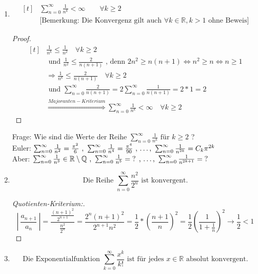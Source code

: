 \documentclass[a4paper,titlepage,oneside]{article}
\def\Q{\ensuremath{\mathbb{Q}} }
\def\R{\ensuremath{\mathbb{R}} }
\def\fa{\ensuremath{\forall}}
\newcommand{\suminf}[2][n]{\ensuremath{\sum_{#1= 0}^{\infty}{#2}}}
\newcommand{\abs}[1]{\ensuremath{\left|\:#1\:\right|}}
\theoremstyle{thmstyle}
\begin{document}
\begin{subbsp}
\begin{enumerate}
\item %
\[\begin{aligned}[t]
&\suminf{\frac{1}{n^k}} < \infty \qquad \forall k \ge 2 \\
&\text{[Bemerkung: Die Konvergenz gilt auch \(\fa k \in \R, k > 1\) ohne Beweis]}
\end{aligned}\]

\begin{proof}
\[\begin{aligned}[t]
&\frac{1}{n^k} \le \frac{1}{n^2} \quad \forall k \ge 2 \\
&\text{ und } \frac{1}{n^2} \le \frac{2}{n(n+1)} \text{ , denn } 2n^2 \ge n(n+1) \Leftrightarrow n^2 \ge n \Leftrightarrow n \ge 1 \\
&\Rightarrow \frac{1}{n^k} \le \frac{2}{n(n+1)} \quad \forall k \ge 2 \\
&\text{ und } \suminf{\frac{2}{n(n+1)}} = 2 \suminf{\frac{1}{n(n+1)}} = 2 * 1 = 2 \\
&\overset{Majoranten-Kriterium}{\Rightarrow} \suminf{\frac{1}{n^k}} < \infty \quad \forall k \ge 2
\end{aligned}\]
\end{proof}
Frage: Wie sind die Werte der Reihe \(\suminf{\frac{1}{n^k}} \text{ für } k \ge 2 \) ? \\
Euler: \(\suminf{\frac{1}{n^2}} = \frac{\pi^2}{6} \text{ , } \suminf{\frac{1}{n^4}} = \frac{\pi^4}{90} \text{ , \dots , } \suminf{\frac{1}{n^{2k}}} = C_k \pi^{2k}\) \\
Aber: \(\suminf{\frac{1}{n^3}} \in \R \setminus \Q \text{ , } \suminf{\frac{1}{n^5}} = \text{? } \text{, \dots , } \suminf{\frac{1}{n^{2k+1}}} = \text{? }\)

\item
\[\text{Die Reihe } \suminf{\frac{n^2}{2^n}} \text{ ist konvergent.}\]

\begin{proof}[Quotienten-Kriterium:]
\[\abs{\frac{a_{n+1}}{a_n}} = \frac{\frac{(n+1)^2}{2^{n+1}}}{\frac{n^2}{2^n}} = \frac{2^n(n+1)^2}{2^{n+1}n^2} = \frac{1}{2} * \left(\frac{n+1}{n}\right)^2 = \frac{1}{2} \left(\frac{1}{1+\frac{1}{n}}\right)^2 \longrightarrow \frac{1}{2} < 1\]
\end{proof}

\item
\[\text{Die Exponentialfunktion } \suminf[k]{\frac{x^k}{k!}} \text{ ist für jedes } x \in \R \text{ absolut konvergent.}\]


\end{enumerate}
\end{subbsp}
\end{document}
